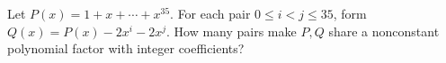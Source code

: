 Let $P(x)=1+x+\cdots+x^{35}$. For each pair $0\le i<j\le35$, form $Q(x)=P(x)-2x^i-2x^j$. How many pairs make $P,Q$ share a nonconstant polynomial factor with integer coefficients?
